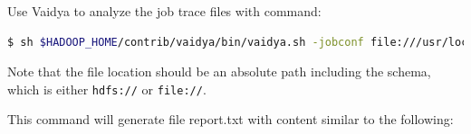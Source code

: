 Use Vaidya to analyze the job trace files with command:
\lstset{style=bashstyle}
\begin{lstlisting}[language=bash]
$ sh $HADOOP_HOME/contrib/vaidya/bin/vaidya.sh -jobconf file:///usr/local/hadoop/logs/history/job_201304012330_0002_conf.xml -joblog file:///usr/local/hadoop/logs/history/job_201304012330_0002_1364874504561_hduser_TeraGen -report report.txt
\end{lstlisting}

\begin{info}
Note that the file location should be an absolute path including the schema, which is either \verb|hdfs://| or \verb|file://|.
\end{info}

This command will generate file report.txt with content similar to the following:
\lstset{style=bashstyle}
